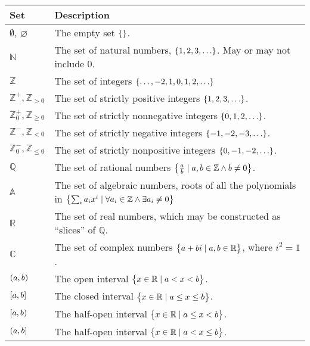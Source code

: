 \documentclass[a4paper,11pt]{article}
\begin{document}
    \begin{longtable}{ll}
    \toprule
    \bfseries Set & \bfseries Description \\
    \midrule
    \endhead
    $\emptyset$, $\varnothing$ & The empty set $\set{}$. \\
    $\mathbb{N}$ & The set of natural numbers, $\set{1, 2, 3, \ldots}$.
                   May or may not include $0$. \\
    $\mathbb{Z}$ & The set of integers $\set{\ldots, -2, 1, 0, 1, 2, \ldots}$ \\
    $\mathbb{Z}^+, \mathbb{Z}_{> 0}$ & The set of strictly positive integers
                   $\set{1, 2, 3, \ldots}$. \\
    $\mathbb{Z}^+_0, \mathbb{Z}_{\ge 0}$ &
                   The set of strictly nonnegative integers
                   $\set{0, 1, 2, \ldots}$. \\
    $\mathbb{Z}^-, \mathbb{Z}_{< 0}$ & The set of strictly negative integers
                   $\set{-1, -2, -3, \ldots}$. \\
    $\mathbb{Z}^-_0, \mathbb{Z}_{\le 0}$ &
                   The set of strictly nonpositive integers
                   $\set{0, -1, -2, \ldots}$. \\
    $\mathbb{Q}$ & The set of rational numbers
                   $\set{\frac ab \mid a, b \in \mathbb{Z} \land b \neq 0}$.\\
    $\mathbb{A}$ & The set of algebraic numbers, roots of all the polynomials in
                   $\set{\sum_i a_i x^i \mid \forall a_i \in \mathbb{Z} \land
                         \exists a_i \neq 0}$ \\
    $\mathbb{R}$ & The set of real numbers, which may be constructed as
                   ``slices'' of $\mathbb{Q}$. \\
    $\mathbb{C}$ & The set of complex numbers
                   $\set{a + bi \mid a, b \in \mathbb{R}}$, where $i^2 = 1$.\\
    $\intoo{a, b}$ & The open interval
                     $\set{x \in \mathbb{R} \mid a < x < b}$.\\
    $\intcc{a, b}$ & The closed interval
                     $\set{x \in \mathbb{R} \mid a \le x \le b}$.\\
    $\intco{a, b}$ & The half-open interval
                     $\set{x \in \mathbb{R} \mid a \le x < b}$.\\
    $\intoc{a, b}$ & The half-open interval
                     $\set{x \in \mathbb{R} \mid a < x \le b}$.\\
    \bottomrule
    \end{longtable}
\end{document}
